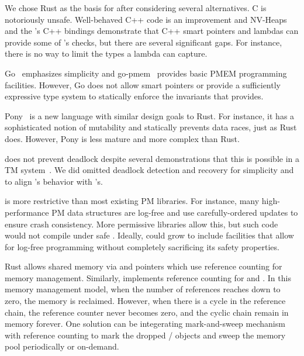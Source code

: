 We chose Rust as the basis for \this{} after
considering several alternatives.  C is notoriously unsafe.  Well-behaved C++ code
is an improvement and NV-Heaps and the 's C++ bindings demonstrate that C++
smart pointers and lambdas can provide some of \this{}'s checks, but there are
several significant gaps.  For instance, there is no way to limit the types a
lambda can capture.

Go~\cite{golang} emphasizes simplicity and go-pmem~\cite{gopmem} provides basic
PMEM programming facilities.  However, Go does not allow smart pointers or
provide a sufficiently expressive type system to statically enforce the
invariants that \this{} provides.

Pony~\cite{pony} is a new language with similar design goals to Rust.  For
instance, it has a sophisticated notion of mutability and statically prevents
data races, just as Rust does.  However, Pony is less mature and more complex
than Rust.



 \This{} does not prevent deadlock despite several
demonstrations that this is possible in a TM
system~\cite{convoider,grace,tm2c,stmlock}.  We did omitted deadlock detection and
recovery for simplicity and to align 's behavior with 's.
  
 \This{} is more restrictive than most
existing PM libraries.  For instance, many high-performance PM data structures
are log-free and use carefully-ordered updates to ensure crash consistency.
More permissive libraries allow this, but such code would not compile under
safe \this{}.  Ideally, \this{} could grow to include
 facilities that allow for log-free programming without completely
sacrificing its safety properties.

 Rust allows shared memory via  and  pointers which use reference counting for memory management. Similarly, \this{} implements reference counting for  and . In this memory management model, when the number of references reaches down to zero, the memory is reclaimed. However, when there is a cycle in the reference chain, the reference counter never becomes zero, and the cyclic chain remain in memory forever. One solution can be integerating mark-and-sweep mechanism with reference counting to mark the dropped / objects and sweep the memory pool periodically or on-demand.

